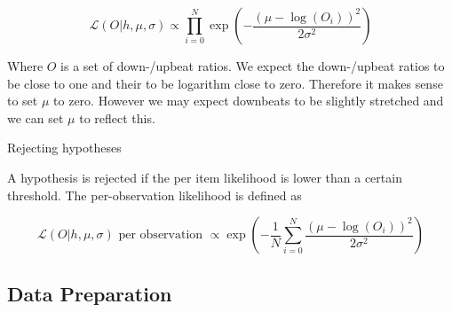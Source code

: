 \begin{equation}
\label{eq:h_likelihood}
\mathcal{L}(O|h, \mu, \sigma) \propto \prod_{i=0}^N \exp\left(-\frac{(\mu - \log(O_i))^2}{2\sigma^2}\right)
\end{equation}

Where $O$ is a set of down-/upbeat ratios. We expect the down-/upbeat ratios to be close to one and their to be logarithm close to zero. Therefore it makes sense to set $\mu$ to zero. However we may expect downbeats to be slightly stretched and we can set $\mu$ to reflect this.

Rejecting hypotheses

A hypothesis is rejected if the per item likelihood is lower than a certain threshold. The per-observation likelihood is defined as

\begin{equation}
\label{eq:per_obs_likelihood}
\mathcal{L}(O|h, \mu, \sigma) \mbox{ per observation } \propto \exp\left(-\frac{1}{N}\sum_{i=0}^N \frac{(\mu - \log(O_i))^2}{2\sigma^2}\right)
\end{equation}









\subsection{Data Preparation}

